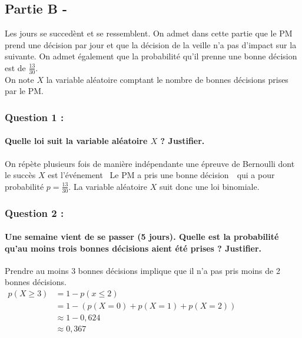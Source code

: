 \documentclass[a4paper, 12pt]{article}
\begin{document}
{}
\subsection*{Partie B -}
Les jours se succedènt et se ressemblent. On admet dans cette partie que le PM prend une décision par jour et que la décision de la veille n'a pas d'impact sur la suivante. 
On admet également que la probabilité qu'il prenne une bonne décision est de $\frac{13}{30}$.
\\
On note $X$ la variable aléatoire comptant le nombre de bonnes décisions prises par le PM.

{}
\subsubsection*{Question 1 :}
\paragraph*{Quelle loi suit la variable aléatoire $X$ ? Justifier. \\[5mm]}

On répète plusieurs fois de manière indépendante une épreuve de Bernoulli dont le succès $X$ est l'événement \guillemotleft \ Le PM a pris une bonne décision\ \guillemotright \
qui a pour probabilité $p = \frac{13}{30}$. La variable aléatoire $X$ suit donc une loi binomiale.

{}
\subsubsection*{Question 2 :}
\paragraph*{Une semaine vient de se passer (5 jours). Quelle est la probabilité qu'au moins trois bonnes décisions aient été prises ? Justifier.\\[5mm]}

Prendre au moins 3 bonnes décisions implique que il n'a pas pris moins de 2 bonnes décisions.\\
$\begin{aligned}
p(X \geq 3) &= 1 - p(x \leq 2) \\
&= 1- \left( p(X=0) + p(X = 1) + p(X = 2)\right) \\
&\approx 1 - 0,624 \\
&\approx 0,367
\end{aligned}$
\end{document}
